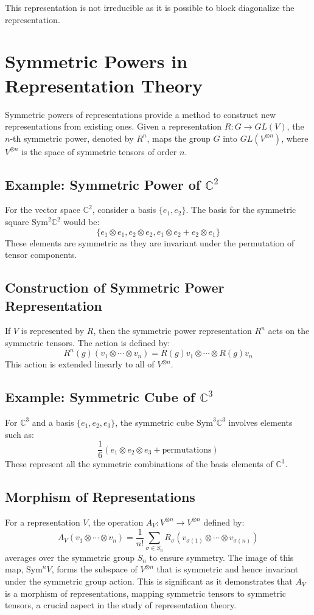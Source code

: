 \documentclass{article}
\begin{document}
This representation is not irreducible as it is possible to block diagonalize the representation.

\section*{Symmetric Powers in Representation Theory}

Symmetric powers of representations provide a method to construct new representations from existing ones. Given a representation \( R: G \to GL(V) \), the \(n\)-th symmetric power, denoted by \( R^n \), maps the group \( G \) into \( GL(V^{\otimes n}) \), where \( V^{\otimes n} \) is the space of symmetric tensors of order \(n\).

\subsection*{Example: Symmetric Power of \( \mathbb{C}^2 \)}
For the vector space \( \mathbb{C}^2 \), consider a basis \( \{e_1, e_2\} \). The basis for the symmetric square \( \text{Sym}^2 \mathbb{C}^2 \) would be:
\[ \{ e_1 \otimes e_1, e_2 \otimes e_2, e_1 \otimes e_2 + e_2 \otimes e_1 \} \]
These elements are symmetric as they are invariant under the permutation of tensor components.

\subsection*{Construction of Symmetric Power Representation}
If \( V \) is represented by \( R \), then the symmetric power representation \( R^n \) acts on the symmetric tensors. The action is defined by:
\[ R^n(g)(v_1 \otimes \cdots \otimes v_n) = R(g)v_1 \otimes \cdots \otimes R(g)v_n \]
This action is extended linearly to all of \( V^{\otimes n} \).

\subsection*{Example: Symmetric Cube of \( \mathbb{C}^3 \)}
For \( \mathbb{C}^3 \) and a basis \( \{e_1, e_2, e_3\} \), the symmetric cube \( \text{Sym}^3 \mathbb{C}^3 \) involves elements such as:
\[ \frac{1}{6}(e_1 \otimes e_2 \otimes e_3 + \text{permutations}) \]
These represent all the symmetric combinations of the basis elements of \( \mathbb{C}^3 \).

\subsection*{Morphism of Representations}
For a representation \( V \), the operation \( A_V: V^{\otimes n} \to V^{\otimes n} \) defined by:
\[ A_V(v_1 \otimes \cdots \otimes v_n) = \frac{1}{n!} \sum_{\sigma \in S_n} R_{\sigma}(v_{\sigma(1)} \otimes \cdots \otimes v_{\sigma(n)}) \]
averages over the symmetric group \( S_n \) to ensure symmetry. The image of this map, \( \text{Sym}^n V \), forms the subspace of \( V^{\otimes n} \) that is symmetric and hence invariant under the symmetric group action. This is significant as it demonstrates that \( A_V \) is a morphism of representations, mapping symmetric tensors to symmetric tensors, a crucial aspect in the study of representation theory.
\end{document}

